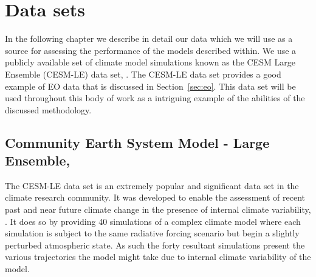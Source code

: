 

\chapter{Data sets\label{cha:data}}  %

\ifpdf
    \graphicspath{{Chapter2/Figs/Raster/}{Chapter2/Figs/PDF/}{Chapter2/Figs/}}
\else
    \graphicspath{{Chapter2/Figs/Vector/}{Chapter2/Figs/}}
\fi

In the following chapter we describe in detail our data which we will use as a source for assessing the performance of the models described within.
We use a publicly available set of climate model simulations known as the CESM Large Ensemble (CESM-LE) data set, \citep{kay_community_2015}.
The CESM-LE data set provides a good example of EO data that is discussed in Section~\ref{sec:eo}.
This data set will be used throughout this body of work as a intriguing example of the abilities of the discussed methodology. 

 \section[CESM-LE]{\label{sec:cesmle}Community Earth System Model - Large Ensemble,  \citep{kay_community_2015}}
 The CESM-LE data set is an extremely popular and significant data set in the climate research community.
 It was developed to enable the assessment of recent past and near future climate change in the presence of internal climate variability, \citep{kay_community_2015}.
 It does so by providing 40 simulations of a complex climate model where each simulation is subject to the same radiative forcing scenario but begin a slightly perturbed atmospheric state.
 As such the forty resultant simulations present the various trajectories the model might take due to internal climate variability of the model. 
 
